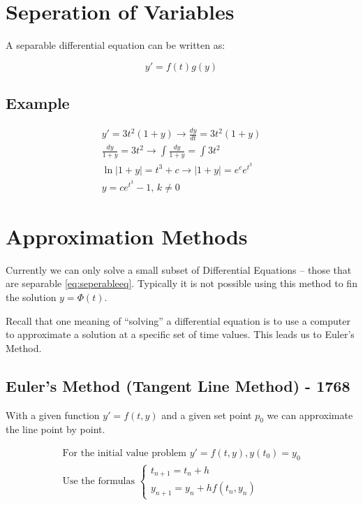 \documentclass[12pt, landscape, twocolumn]{article}
\newcommand{\abs}[1]{\left\lvert#1\right\rvert}           %
\begin{document}
\section{Seperation of Variables}
A separable differential equation can be written as:

\begin{equation}\label{eq:seperableeq}
y\prime = f(t)g(y)
\end{equation}

    \subsection{Example}
    \[
    \begin{aligned}
        y\prime = 3t^2 (1 + y) \to \frac{dy}{dt} = 3t^2 (1 + y)\\
        \frac{dy}{1+y} = 3t^2 \to \int \frac{dy}{1+y} = \int 3t^2\\
        \ln\abs{1 + y} = t^3 + c \to \abs{1 + y} = e^c e^{t^3}\\
        y = c e^{t^3} - 1, \, k \ne 0
    \end{aligned}
    \]

\section{Approximation Methods}

Currently we can only solve a small subset of Differential Equations -- those that are separable \eqref{eq:seperableeq}. Typically it is not possible using this method to fin the solution $y=\Phi (t)$.

Recall that one meaning of ``solving'' a differential equation is to use a computer to approximate a solution at a specific set of time values. This leads us to Euler's Method.

    \subsection{Euler's Method (Tangent Line Method) - 1768}
    With a given function $y\prime = f(t,y)$ and a given set point $p_0$ we can approximate the line point by point.

    \begin{equation}\label{eq:eulersmethod}
    \begin{aligned}
    \text{For the initial value problem } y\prime = f(t,y), y(t_0) = y_0\\
    \text{Use the formulas }
    \begin{cases}
    t_{n+1} = t_n + h\\
    y_{n+1} = y_n + h f(t_n, y_n)
    \end{cases}
    \end{aligned}
    \end{equation}
\end{document}
